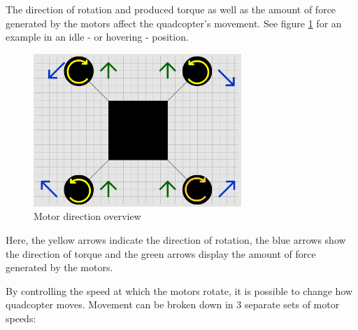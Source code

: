 The direction of rotation and produced torque as well as the amount of force generated by the motors affect the quadcopter's movement. See figure \ref{droneDirections} for an example in an idle - or hovering - position.
\begin{figure}[H]
  \centering
    \includegraphics[width=0.7\textwidth]{images/droneDirections.png}
	\caption{Motor direction overview}
	\label{droneDirections}
\end{figure}
Here, the yellow arrows indicate the direction of rotation, the blue arrows show the direction of torque and the green arrows display the amount of force generated by the motors.

By controlling the speed at which the motors rotate, it is possible to change how quadcopter moves. Movement can be broken down in 3 separate sets of motor speeds:

